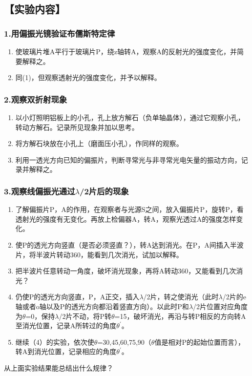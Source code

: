 \documentclass[12pt,a4paper,UTF8]{ctexart}
\begin{document}
\subsection*{【实验内容】}

	\subsubsection*{1.用偏振光镜验证布儒斯特定律}
	\begin{enumerate}[(1)]
			\item 使玻璃片堆A平行于玻璃片P，绕z轴转A，观察A的反射光的强度变化，并简要解释之。
			\item 同(1)，但观察透射光的强度变化，并予以解释。
	\end{enumerate}
	\subsubsection*{2.观察双折射现象}
	\begin{enumerate}[(1)]
			\item 以小灯照明铝板上的小孔，孔上放方解石\uppercase\expandafter{}（负单轴晶体），通过它观察小孔，转动方解石。记录所见现象并加以思考。
			\item 将方解石块\uppercase\expandafter{}放在小孔上（磨面压小孔），作同样的观察。
			\item 利用一透光方向已知的偏振片，判断寻常光与非寻常光电矢量的振动方向，记录并解释之。
	\end{enumerate}
	\subsubsection*{3.观察线偏振光通过$\lambda$/2片后的现象}
	\begin{enumerate}[(1)]
			\item 了解偏振片P，A的作用，在观察者与光源S之间，放入偏振片P，旋转P，看透射光的强度有无变化。再放上检偏器A，转A，观察光透过A的强度怎样变化。
			\item 使P的透光方向竖直（是否必须竖直？），转A达到消光。在P，A间插入半波片，将半波片转动360\degree，能看到几次消光，试加以解释。
			\item 把半波片任意转动一角度，破坏消光现象，再将A转动360\degree，又能看到几次消光？
			\item 仍使P的透光方向竖直，P，A正交，插入$\lambda$/2片，转之使消光（此时$\lambda$/2片的e轴或者o轴以及P的透光方向都沿着竖直方向）。以此时P和$\lambda$/2片位置对应角度为$\theta$=0\degree，保持$\lambda$/2片不动，将P转$\theta$=15\degree，破坏消光，再沿与转P相反的方向转A至消光位置，记录A所转过的角度$\theta^{\prime}$。
			\item 继续（4）的实验，依次使$\theta$=30\degree,45\degree,60\degree,75\degree,90\degree（$\theta$值是相对P的起始位置而言），转A到消光位置，记录相应的角度$\theta^{\prime}$。
	\end{enumerate}
	从上面实验结果能总结出什么规律？
\end{document}
